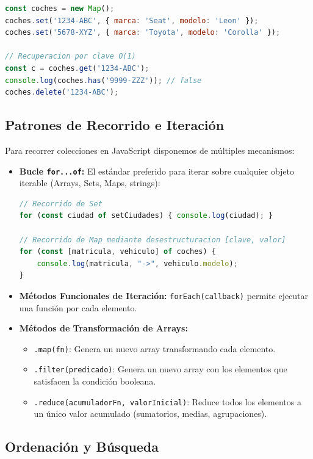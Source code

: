 \begin{lstlisting}[language=javascript]
const coches = new Map();
coches.set('1234-ABC', { marca: 'Seat', modelo: 'Leon' });
coches.set('5678-XYZ', { marca: 'Toyota', modelo: 'Corolla' });

// Recuperacion por clave O(1)
const c = coches.get('1234-ABC');
console.log(coches.has('9999-ZZZ')); // false
coches.delete('1234-ABC');
\end{lstlisting}

\subsection{Patrones de Recorrido e Iteración}

Para recorrer colecciones en JavaScript disponemos de múltiples mecanismos:
\begin{itemize}
    \item \textbf{Bucle \texttt{for...of}:} El estándar preferido para iterar sobre cualquier objeto iterable (Arrays, Sets, Maps, strings):
\begin{lstlisting}[language=javascript]
// Recorrido de Set
for (const ciudad of setCiudades) { console.log(ciudad); }

// Recorrido de Map mediante desestructuracion [clave, valor]
for (const [matricula, vehiculo] of coches) {
    console.log(matricula, "->", vehiculo.modelo);
}
\end{lstlisting}
    \item \textbf{Métodos Funcionales de Iteración:} \texttt{forEach(callback)} permite ejecutar una función por cada elemento.
    \item \textbf{Métodos de Transformación de Arrays:}
    \begin{itemize}
        \item \texttt{.map(fn)}: Genera un nuevo array transformando cada elemento.
        \item \texttt{.filter(predicado)}: Genera un nuevo array con los elementos que satisfacen la condición booleana.
        \item \texttt{.reduce(acumuladorFn, valorInicial)}: Reduce todos los elementos a un único valor acumulado (sumatorios, medias, agrupaciones).
    \end{itemize}
\end{itemize}

\subsection{Ordenación y Búsqueda}

